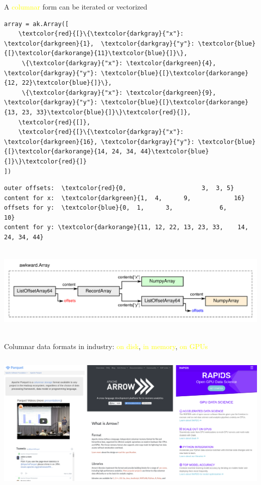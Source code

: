 \documentclass[aspectratio=169]{beamer}
\begin{document}
\begin{frame}[fragile]{A \textcolor{yellow}{columnar} form can be iterated or vectorized}
\small

\begin{Verbatim}[commandchars=\\\{\}]
array = ak.Array([
    \textcolor{red}{[}\{\textcolor{darkgray}{"x"}: \textcolor{darkgreen}{1},  \textcolor{darkgray}{"y"}: \textcolor{blue}{[}\textcolor{darkorange}{11}\textcolor{blue}{]}\},
     \{\textcolor{darkgray}{"x"}: \textcolor{darkgreen}{4},  \textcolor{darkgray}{"y"}: \textcolor{blue}{[}\textcolor{darkorange}{12, 22}\textcolor{blue}{]}\},
     \{\textcolor{darkgray}{"x"}: \textcolor{darkgreen}{9},  \textcolor{darkgray}{"y"}: \textcolor{blue}{[}\textcolor{darkorange}{13, 23, 33}\textcolor{blue}{]}\}\textcolor{red}{]},
    \textcolor{red}{[]},
    \textcolor{red}{[}\{\textcolor{darkgray}{"x"}: \textcolor{darkgreen}{16}, \textcolor{darkgray}{"y"}: \textcolor{blue}{[}\textcolor{darkorange}{14, 24, 34, 44}\textcolor{blue}{]}\}\textcolor{red}{]}
])
\end{Verbatim}

\begin{Verbatim}[commandchars=\\\{\}]
outer offsets:  \textcolor{red}{0,                     3,  3, 5}
content for x:  \textcolor{darkgreen}{1,  4,      9,            16}
offsets for y:  \textcolor{blue}{0,  1,      3,             6,            10}
content for y: \textcolor{darkorange}{11, 12, 22, 13, 23, 33,    14, 24, 34, 44}
\end{Verbatim}

\mbox{ } \hfill \includegraphics[width=0.9\linewidth]{img/example-hierarchy.pdf} \hfill \mbox{ }
\end{frame}

\begin{frame}{Columnar data formats in industry: \textcolor{yellow}{on disk}, \textcolor{yellow}{in memory}, \textcolor{yellow}{on GPUs}}
\vspace{0.2 cm}
\begin{columns}
\includegraphics[width=\linewidth]{img/three-columnar-websites.png}
\end{columns}
\end{frame}
\end{document}
